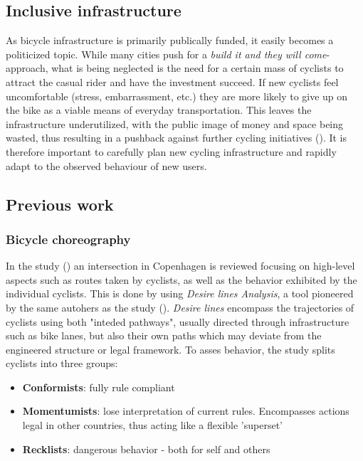 \subsection{Inclusive infrastructure}
As bicycle infrastructure is primarily publically funded, it easily becomes a politicized topic. 
While many cities push for a \textit{build it and they will come}-approach, what is being neglected
is the need for a certain mass of cyclists to attract the casual rider and have the investment succeed.
If new cyclists feel uncomfortable (stress, embarrassment, etc.) they are more likely to give up on the bike as a viable means of everyday transportation. 
This leaves the infrastructure underutilized, with the public image of money and space being wasted, 
thus resulting in a pushback against further cycling initiatives (\cite{backlash}).
It is therefore important to carefully plan new cycling infrastructure and rapidly adapt to the observed behaviour of new users.

\subsection{Previous work}

\subsubsection{Bicycle choreography}
In the study (\cite{copenhagenize2014}) an intersection in Copenhagen is reviewed focusing on high-level aspects
such as routes taken by cyclists, as well as the behavior exhibited by the individual cyclists.
This is done by using \textit{Desire lines Analysis}, a tool pioneered by the same autohers as the study (\cite{copenhagenize_book}).
\textit{Desire lines} encompass the trajectories of cyclists using both "inteded pathways", usually directed through infrastructure such as
 bike lanes, but also their own paths which may deviate from the engineered structure or legal framework.
 To asses behavior, the study splits cyclists into three groups:

\begin{itemize}
	\item \textbf{Conformists}: fully rule compliant
	\item \textbf{Momentumists}: lose interpretation of current rules. Encompasses actions legal in other countries, thus acting like a  flexible 'superset'
	\item \textbf{Recklists}: dangerous behavior - both for self and others
\end{itemize}

